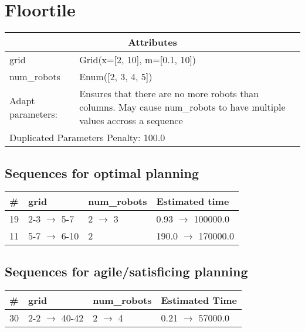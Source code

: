 \documentclass{article}
\begin{document}
                            \newpage \section{Floortile}
                    \begin{center}
                    \begin{tabular}{@{}p{}p{}@{}}
                    \multicolumn{2}{c}{\bf \large Attributes}\\\midrule
                    grid & Grid(x=[2, 10], m=[0.1, 10])\\
num\_robots & Enum([2, 3, 4, 5])
                    \\\midrule
                    Adapt parameters: & Ensures that there are no more robots than columns. May cause num\_robots to have multiple values accross a sequence \\\midrule
                    \multicolumn{2}{l}{Duplicated Parameters Penalty: 100.0}
                    \end{tabular}
                    \end{center}
                
                            \subsection*{Sequences for optimal planning}

                            \begin{center}
                            \begin{tabular}{@{}l|l|l|l@{}}
                            \# & grid & num\_robots & Estimated time\\\midrule
                            19&2-3 $\rightarrow$ 5-7&2 $\rightarrow$ 3&0.93 $\rightarrow$ 100000.0\\
11&5-7 $\rightarrow$ 6-10&2&190.0 $\rightarrow$ 170000.0
                            \end{tabular}
                            \end{center}
                    
                         \subsection*{Sequences for agile/satisficing planning}

                        \begin{center}
                        \begin{tabular}{@{}l|l|l|l@{}}
                        \# & grid & num\_robots & Estimated Time\\\midrule
                        30&2-2 $\rightarrow$ 40-42&2 $\rightarrow$ 4&0.21 $\rightarrow$ 57000.0
                        \end{tabular}
                        \end{center}
                    
\end{document}

